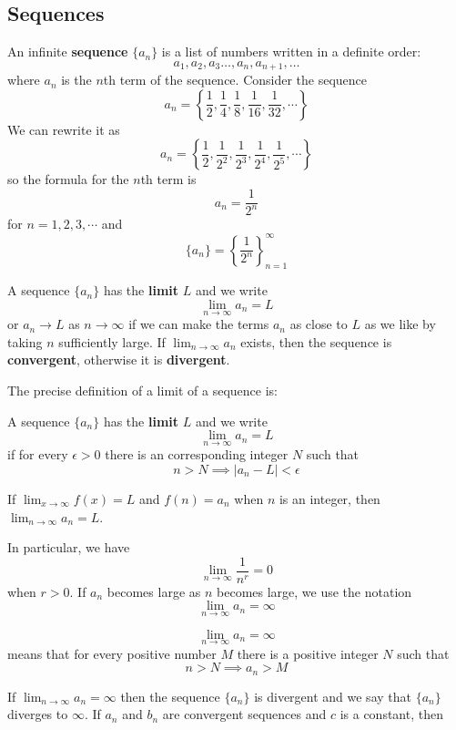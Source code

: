 \subsection{Sequences}

An infinite \textbf{sequence} \(\{a_n\}\) is a list of numbers written in a
definite order:
\[a_1,a_2,a_3\dots,a_n,a_{n+1},\dots\]
where \(a_n\) is the \(n\)th term of the sequence.
Consider the sequence
\[a_n=\left\{\frac{1}{2},\frac{1}{4},\frac{1}{8},\frac{1}{16},\frac{1}{32},
\cdots\right\}\]
We can rewrite it as
\[a_n=\left\{\frac{1}{2},\frac{1}{2^2},\frac{1}{2^3},\frac{1}{2^4},
\frac{1}{2^5},\cdots\right\}\]
so the formula for the \(n\)th term is
\[a_n=\frac{1}{2^n}\]
for \(n=1,2,3,\cdots\) and
\[\{a_n\}=\left\{\frac{1}{2^n}\right\}_{n=1}^\infty\]
\begin{definition}
    A sequence \(\{a_n\}\) has the \textbf{limit} \(L\) and we write
    \[\lim_{n\to\infty}a_n=L\]
    or \(a_n\to L\) as \(n\to\infty\) if we can make the terms \(a_n\) as
    close to \(L\) as we like by taking \(n\) sufficiently large.
    If \(\displaystyle{\lim_{n\to\infty}a_n}\) exists, then the sequence is
    \textbf{convergent}, otherwise it is \textbf{divergent}.
\end{definition}
The precise definition of a limit of a sequence is:
\begin{definition}
    A sequence \(\{a_n\}\) has the \textbf{limit} \(L\) and we write
    \[\lim_{n\to\infty}a_n=L\]
    if for every \(\epsilon>0\) there is an corresponding integer \(N\) such
    that
    \[n>N\implies |a_n-L|<\epsilon\]
\end{definition}
\begin{theorem}
    If \(\displaystyle{\lim_{x\to\infty}f(x)=L}\) and \(f(n)=a_n\) when \(n\) is an integer,
    then \(\displaystyle{\lim_{n\to\infty}a_n=L}\). 
\end{theorem}
In particular, we have
\[\lim_{n\to\infty}\frac{1}{n^r}=0\]
when \(r>0\).
If \(a_n\) becomes large as \(n\) becomes large, we use the notation
\[\lim_{n\to\infty}a_n=\infty\]
\begin{definition}
    \[\lim_{n\to\infty}a_n=\infty\]
    means that for every positive number \(M\) there is a positive integer
    \(N\) such that
    \[n>N\implies a_n>M\]
\end{definition}
If \(\displaystyle{\lim_{n\to\infty}a_n=\infty}\) then the sequence
\(\{a_n\}\) is divergent and we say that \(\{a_n\}\) diverges to \(\infty\).
If \(a_n\) and \(b_n\) are convergent sequences and \(c\) is a constant, then
